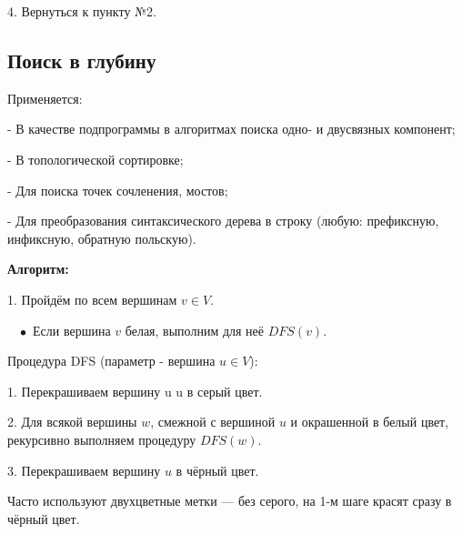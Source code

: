 \documentclass[utf8,14pt,a4paper,oneside,russian]{book}
\begin{document}
	4. Вернуться к пункту №2.
	
	\subsection{Поиск в глубину}
	
	Применяется:
	
	- В качестве подпрограммы в алгоритмах поиска одно- и двусвязных компонент;
	
	- В топологической сортировке;
	
	- Для поиска точек сочленения, мостов;
	
	- Для преобразования синтаксического дерева в строку (любую: префиксную, инфиксную, обратную польскую).
	
	\textbf{Алгоритм:}
	
	1. Пройдём по всем вершинам $v \in V$.
	
	$\; \; \; \bullet$ Если вершина $v$ белая, выполним для неё $DFS(v)$.
	
	Процедура DFS (параметр - вершина $u\in V$):
	
	1. Перекрашиваем вершину u u в серый цвет.
	
	2. Для всякой вершины $w$, смежной с вершиной $u$ и окрашенной в белый цвет, рекурсивно выполняем процедуру $DFS(w)$.
	
	3. Перекрашиваем вершину $u$ в чёрный цвет.
	
	Часто используют двухцветные метки — без серого, на 1-м шаге красят сразу в чёрный цвет. 
	
\end{document}
